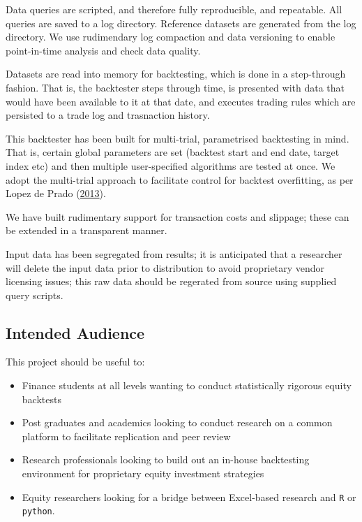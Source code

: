 \documentclass[11pt,preprint, authoryear]{elsarticle}
\numberwithin{equation}{section}
\numberwithin{figure}{section}
\numberwithin{table}{section}
\def\tightlist{} %
\begin{document}
Data queries are scripted, and therefore fully reproducible, and
repeatable. All queries are saved to a log directory. Reference datasets
are generated from the log directory. We use rudimendary log compaction
and data versioning to enable point-in-time analysis and check data
quality.

Datasets are read into memory for backtesting, which is done in a
step-through fashion. That is, the backtester steps through time, is
presented with data that would have been available to it at that date,
and executes trading rules which are persisted to a trade log and
trasnaction history.

This backtester has been built for multi-trial, parametrised backtesting
in mind. That is, certain global parameters are set (backtest start and
end date, target index etc) and then multiple user-specified algorithms
are tested at once. We adopt the multi-trial approach to facilitate
control for backtest overfitting, as per Lopez de Prado
(\protect\hyperlink{ref-LopezdePrado2013}{2013}).

We have built rudimentary support for transaction costs and slippage;
these can be extended in a transparent manner.

Input data has been segregated from results; it is anticipated that a
researcher will delete the input data prior to distribution to avoid
proprietary vendor licensing issues; this raw data should be regerated
from source using supplied query scripts.

\subsection{Intended Audience}\label{intended-audience}

This project should be useful to:

\begin{itemize}
\tightlist
\item
  Finance students at all levels wanting to conduct statistically
  rigorous equity backtests
\item
  Post graduates and academics looking to conduct research on a common
  platform to facilitate replication and peer review
\item
  Research professionals looking to build out an in-house backtesting
  environment for proprietary equity investment strategies
\item
  Equity researchers looking for a bridge between Excel-based research
  and \texttt{R} or \texttt{python}.
\end{itemize}
\end{document}
